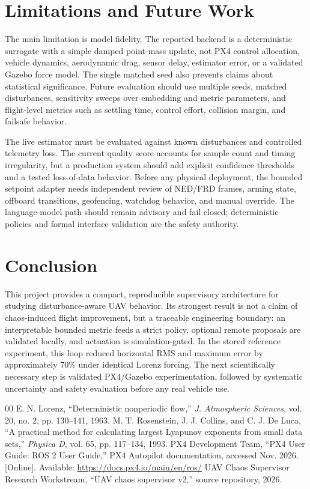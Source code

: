 \documentclass[10pt,conference]{IEEEtran}
\begin{document}
\section{Limitations and Future Work}
The main limitation is model fidelity. The reported backend is a deterministic
surrogate with a simple damped point-mass update, not PX4 control allocation,
vehicle dynamics, aerodynamic drag, sensor delay, estimator error, or a
validated Gazebo force model. The single matched seed also prevents claims
about statistical significance. Future evaluation should use multiple seeds,
matched disturbances, sensitivity sweeps over embedding and metric parameters,
and flight-level metrics such as settling time, control effort, collision
margin, and failsafe behavior.

The live estimator must be evaluated against known disturbances and controlled
telemetry loss. The current quality score accounts for sample count and timing
irregularity, but a production system should add explicit confidence thresholds
and a tested loss-of-data behavior. Before any physical deployment, the bounded
setpoint adapter needs independent review of NED/FRD frames, arming state,
offboard transitions, geofencing, watchdog behavior, and manual override. The
language-model path should remain advisory and fail closed; deterministic
policies and formal interface validation are the safety authority.

\section{Conclusion}
This project provides a compact, reproducible supervisory architecture for
studying disturbance-aware UAV behavior. Its strongest result is not a claim of
chaos-induced flight improvement, but a traceable engineering boundary: an
interpretable bounded metric feeds a strict policy, optional remote proposals
are validated locally, and actuation is simulation-gated. In the stored
reference experiment, this loop reduced horizontal RMS and maximum error by
approximately 70\% under identical Lorenz forcing. The next scientifically
necessary step is validated PX4/Gazebo experimentation, followed by systematic
uncertainty and safety evaluation before any real vehicle use.

\begin{thebibliography}{00}
 E. N. Lorenz, ``Deterministic nonperiodic flow,''
  \emph{J. Atmospheric Sciences}, vol. 20, no. 2, pp. 130--141, 1963.
 M. T. Rosenstein, J. J. Collins, and C. J. De Luca,
  ``A practical method for calculating largest Lyapunov exponents from small
  data sets,'' \emph{Physica D}, vol. 65, pp. 117--134, 1993.
 PX4 Development Team, ``PX4 User Guide: ROS 2 User Guide,''
  PX4 Autopilot documentation, accessed Nov. 2026. [Online]. Available:
  \url{https://docs.px4.io/main/en/ros/}
 UAV Chaos Supervisor Research Workstream, ``UAV chaos
  supervisor v2,'' source repository, 2026.
\end{thebibliography}
\end{document}
